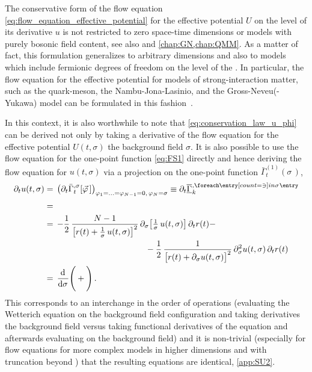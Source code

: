 The conservative form of the \frg{} flow equation \eqref{eq:flow_equation_effective_potential} for the effective potential $U$ on the level of its derivative $u$ is not restricted to zero space-time dimensions or models with purely bosonic field content, see also  and \cref{chap:GN,chap:QMM}.
As a matter of fact, this formulation generalizes to arbitrary dimensions and also to models which include fermionic degrees of freedom on the level of the \lpa{}.
In particular, the flow equation for the effective potential for models of strong-interaction matter, such as the quark-meson, the Nambu-Jona-Lasinio, and the Gross-Neveu(-Yukawa) model can be formulated in this fashion~\cite{Ihssen2020,Grossi:2021ksl,Stoll:2021ori,Ihssen:2022xkr,Ihssen:2023xlp}.

In this context, it is also worthwhile to note that \cref{eq:conservation_law_u_phi} can be derived not only by taking a derivative of the \frg{} flow equation for the effective potential $U ( t, \sigma )$ \wrt{} the background field $\sigma$.
It is also possible to use the flow equation for the one-point function \eqref{eq:FS1} directly and hence deriving the flow equation for $u ( t, \sigma )$ via a projection on the one-point function $\bar{\Gamma}_t^{(1)} ( \sigma \, )$,
	\begin{align}
		\partial_t u ( t, \sigma ) &= \, \big( \partial_t \bar{\Gamma}_t^{,\sigma} [ \vec{\varphi} \, ] \big)_{\varphi_1 = \ldots = \varphi_{N - 1} = 0 , \, \varphi_{N} = \sigma}\equiv\partial_t \FSvertexArg{\FSeaaEoM}{\sigma}\label{eq:0dON1pt}\\[.2em]
		&=\,
		
		\\
		&=\, - \frac{1}{2} \, \frac{N - 1}{\big[ r ( t ) + \frac{1}{\sigma} \, u ( t, \sigma ) \big]^2} \, \partial_\sigma \big[ \tfrac{1}{\sigma} \, u ( t, \sigma ) \big]\,\partial_t r ( t ) -\nonumber\\
		&\qquad\qquad\qquad\qquad\qquad\qquad- \frac{1}{2} \,  \frac{1}{\big[ r ( t ) +  \partial_\sigma u ( t, \sigma ) \big]^2} \, \partial_\sigma^2 u ( t, \sigma )\,\partial_t r ( t ) \\
		&=\, \dod{}{\sigma}\! \Bigg(
		
		+
		\Bigg) \, .
	\end{align}
This corresponds to an interchange in the order of operations (evaluating the Wetterich equation on the background field configuration and taking derivatives \wrt{} the background field versus taking functional derivatives of the \frg{} equation and afterwards evaluating on the background field) and it is non-trivial (especially for flow equations for more complex models in higher dimensions and with truncation beyond \lpa{}) that the resulting equations are identical, \cf{} \cref{app:SU2}.

